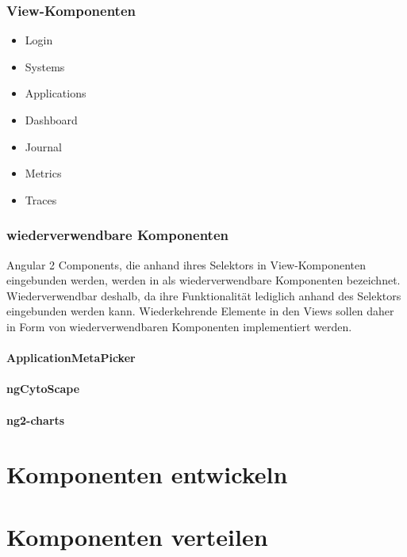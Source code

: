 \subsubsection{View-Komponenten}

\begin{itemize}
  \item Login
  \item Systems
  \item Applications
  \item Dashboard
  \item Journal
  \item Metrics
  \item Traces
\end{itemize}

\subsubsection{wiederverwendbare Komponenten}

Angular 2 Components, die anhand ihres Selektors in View-Komponenten eingebunden werden,
werden in \projectname{} als wiederverwendbare Komponenten bezeichnet.
Wiederverwendbar deshalb, da ihre Funktionalität lediglich anhand des Selektors eingebunden werden kann.
Wiederkehrende Elemente in den Views sollen daher in Form von wiederverwendbaren Komponenten implementiert werden.

\paragraph{ApplicationMetaPicker}




\paragraph{ngCytoScape}
\paragraph{ng2-charts}




\section{Komponenten entwickeln}


\section{Komponenten verteilen}

